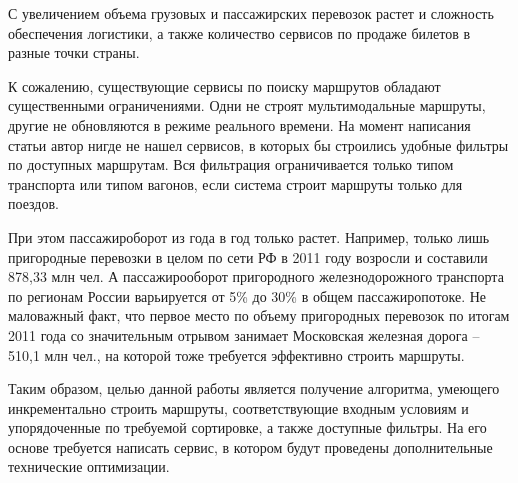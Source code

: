 \startprefacepage
С увеличением объема грузовых и пассажирских перевозок растет и сложность обеспечения логистики, а также количество сервисов по продаже билетов в разные точки страны. 

К сожалению, существующие сервисы по поиску маршрутов обладают существенными ограничениями. Одни не строят мультимодальные маршруты, другие не обновляются в режиме реального времени. На момент написания статьи автор нигде не нашел сервисов, в которых бы строились удобные фильтры по доступных маршрутам. Вся фильтрация ограничивается только типом транспорта или типом вагонов, если система строит маршруты только для поездов.

При этом пассажироборот из года в год только растет. Например, только лишь пригородные перевозки в целом по сети РФ в 2011 году возросли и составили 878,33 млн чел.  А пассажирооборот пригородного железнодорожного транспорта по регионам России варьируется от 5\% до 30\% в общем пассажиропотоке. Не маловажный факт, что первое место по объему пригородных перевозок по итогам 2011 года со значительным отрывом занимает Московская железная дорога -- 510,1 млн чел., на которой тоже требуется эффективно строить маршруты.

Таким образом, целью данной работы является получение алгоритма, умеющего инкрементально строить маршруты, соответствующие входным условиям и упорядоченные по требуемой сортировке, а также доступные фильтры. На его основе требуется написать сервис, в котором будут проведены дополнительные технические оптимизации.
